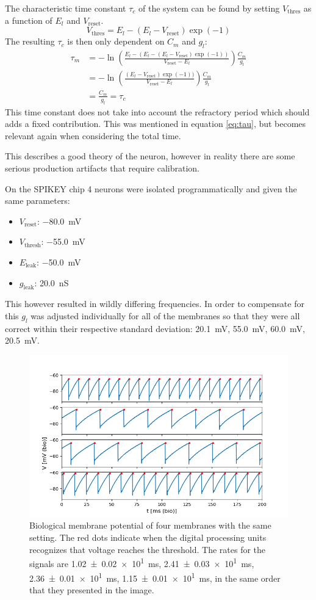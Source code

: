 \documentclass[a4paper,twocolumn]{article}
\begin{document}
The characteristic time constant $\tau_c$ of the system can be found by setting
$V_\text{thres}$ as a function of $E_l$ and $V_\text{reset}$.
\[
    V_\text{thres} = E_l - (E_l - V_\text{reset})\exp(-1)
\]
The resulting $\tau_c$ is then only dependent on $C_m$ and $g_l$:
\begin{align*}
    \tau_m &= -\ln(\frac{E_l - (E_l - (E_l - V_\text{reset})\exp(-1))}{V_\text{reset} - E_l}) \frac{C_m}{g_l}\\
           &= -\ln(\frac{(E_l - V_\text{reset})\exp(-1))}{V_\text{reset} - E_l})\frac{C_m}{g_l} \\
           &= \frac{C_m}{g_l} = \tau_c
\end{align*}
This time constant does not take into account the refractory period which should
adds a fixed contribution. This was mentioned in equation \eqref{eq:tau}, but
becomes relevant again when considering the total time.

This describes a good theory of the neuron, however in reality there are some
serious production artifacts that require calibration.

On the SPIKEY chip 4 neurons were isolated programmatically and given the same
parameters:
\begin{itemize}
    \item $V_\text{reset}$: \SI{-80.0}{\milli\volt}
    \item $V_\text{thresh}$: \SI{-55.0}{\milli\volt}
    \item $E_\text{leak}$: \SI{-50.0}{\milli\volt}
    \item $g_\text{leak}$:  \SI{20.0}{\nano\siemens}
\end{itemize}

This however resulted in wildly differing frequencies. In order to compensate
for this $g_l$ was adjusted individually for all of the membranes so that they
were all correct within their respective standard deviation:
\SI{20.1}{\milli\volt}, \SI{55.0}{\milli\volt}, \SI{60.0}{\milli\volt},
\SI{20.5}{\milli\volt}.

\begin{figure}[ht]
    \centering
    \includegraphics[width=.5\textwidth]{figures/4membranes.png}
    \caption{Biological membrane potential of four membranes with the same
    setting. The red dots indicate when the digital processing units recognizes
    that voltage reaches the threshold. The rates for the signals are
    \SI{1.02(2)e1}{\milli\second}, \SI{2.41(3)e1}{\milli\second},
    \SI{2.36(1)e1}{\milli\second}, \SI{1.15(1)e1}{\milli\second}, in the same
    order that they presented in the image. }
    \label{fig:4membranes}
\end{figure}
\end{document}
